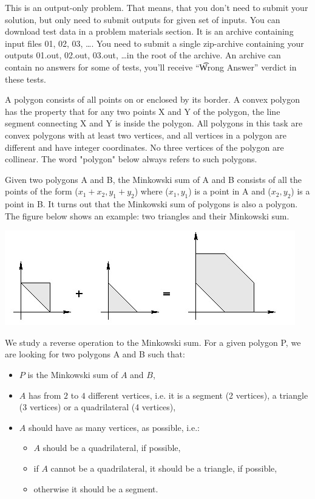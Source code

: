 This is an output-only problem. That means, that you don't need to submit your solution, but only need to submit outputs for given set of inputs. You can download test data in a problem materials section. It is an archive containing input files 01, 02, 03, \dots. You need to submit a single zip-archive containing your outputs 01.out, 02.out, 03.out, \dots in the root of the archive.  An archive can contain no answers for some of tests, you'll receive ``\t{Wrong Answer}'' verdict in these tests.


A polygon consists of all points on or enclosed by its border. A convex polygon has the property that for any two points X and Y of the polygon, the line segment connecting X and Y is inside the polygon. All polygons in this task are convex polygons with at least two vertices, and all vertices in a polygon are different and have integer coordinates. No three vertices of the polygon are collinear. The word "polygon" below always refers to such polygons. 

Given two polygons A and B, the Minkowski sum of A and B consists of all the points of the form ($x_1+x_2, y_1+y_2$) where ($x_1, y_1$) is a point in A and ($x_2, y_2$) is a point in B. It turns out that the Minkowski sum of polygons is also a polygon. The figure below shows an example: two triangles and their Minkowski sum.

\includegraphics{task1a.jpg}

We study a reverse operation to the Minkowski sum. For a given polygon P, we are looking for two polygons A and B such that: 
\begin{itemize}
\item $P$ is the Minkowski sum of $A$ and $B$,
\item $A$ has from $2$ to $4$ different vertices, i.e. it is a segment (2 vertices), a triangle (3 vertices) or a quadrilateral (4 vertices),
\item $A$ should have as many vertices, as possible, i.e.:
\begin {itemize}
\item $A$ should be a quadrilateral, if possible,
\item if $A$ cannot be a quadrilateral, it should be a triangle, if possible,
\item otherwise it should be a segment.
\end{itemize}
\end{itemize}


